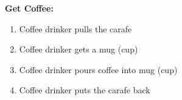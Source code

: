 \documentclass[letterpaper]{article}
\begin{document}
\noindent
\textbf{Get Coffee:  }
\begin{enumerate}
   \item Coffee drinker pulls the carafe
   \item Coffee drinker gets a mug (cup)
   \item Coffee drinker pours coffee into mug (cup)
   \item Coffee drinker puts the carafe back
\end{enumerate}
\end{document}
